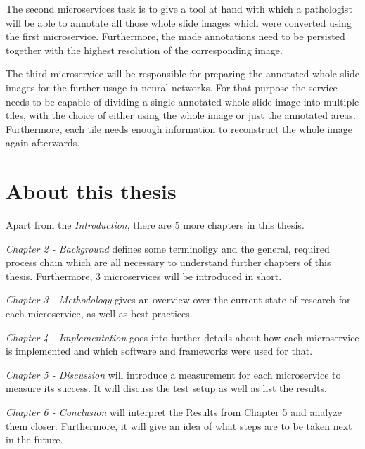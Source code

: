 The second microservices task is to give a tool at hand with which a pathologist will be able to annotate all those whole slide images which were converted using the first microservice. Furthermore, the made annotations need to be persisted together with the highest resolution of the corresponding image.

The third microservice will be responsible for preparing the annotated whole slide images for the further usage in neural networks. For that purpose the service needs to be capable of dividing a single annotated whole slide image into multiple tiles, with the choice of either using the whole image or just the annotated areas. Furthermore, each tile needs enough information to reconstruct the whole image again afterwards.


\section{About this thesis}

Apart from the \emph{Introduction}, there are 5 more chapters in this thesis.

\emph{Chapter 2 - Background} defines some terminoligy and the general, required process chain which are all necessary to understand further chapters of this thesis. Furthermore, 3 microservices will be introduced in short.

\emph{Chapter 3 - Methodology} gives an overview over the current state of research for each microservice, as well as best practices. 

\emph{Chapter 4 - Implementation} goes into further details about how each microservice is implemented and which software and frameworks were used for that.

\emph{Chapter 5 - Discussion} will introduce a measurement for each microservice to measure its success. It will discuss the test setup as well as list the results.

\emph{Chapter 6 - Conclusion} will interpret the Results from Chapter 5 and analyze them closer. Furthermore, it will give an idea of what steps are to be taken next in the future.